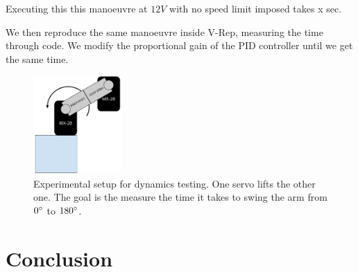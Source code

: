 Executing this  this manoeuvre at $12V$ with no speed limit imposed takes x sec.

We then reproduce the same manoeuvre inside V-Rep, measuring the time through code. We modify the proportional gain of the PID controller until we get the same time.

\begin{figure}[htp]
\center
    \includegraphics[width = 0.3\textwidth]{figures/exp2}
    \caption[Experimental setup dynamics testing]{Experimental setup for dynamics testing. One servo lifts the other one. The goal is the measure the time it takes to swing the arm from $0\degree$ to $180\degree$.}
    \label{fig:exp2}
\end{figure}


\section{Conclusion}